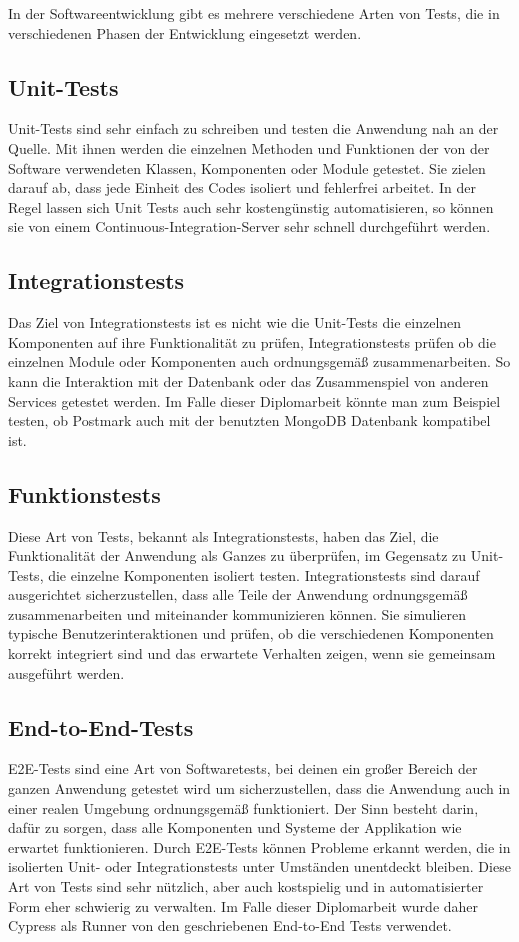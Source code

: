 In der Softwareentwicklung gibt es mehrere verschiedene Arten von Tests, die in verschiedenen Phasen der Entwicklung eingesetzt werden.

\subsection{Unit-Tests}
Unit-Tests sind sehr einfach zu schreiben und testen die Anwendung nah an der Quelle. Mit ihnen werden die einzelnen Methoden und Funktionen der von der Software verwendeten Klassen, Komponenten oder Module getestet. Sie zielen darauf ab, dass jede Einheit des Codes isoliert und fehlerfrei arbeitet. In der Regel lassen sich Unit Tests auch sehr kostengünstig automatisieren, so können sie von einem Continuous-Integration-Server sehr schnell durchgeführt werden.


\subsection{Integrationstests}
Das Ziel von Integrationstests ist es nicht wie die Unit-Tests die einzelnen Komponenten auf ihre Funktionalität zu prüfen, Integrationstests prüfen ob die einzelnen Module oder Komponenten auch ordnungsgemäß zusammenarbeiten. So kann die Interaktion mit der Datenbank oder das Zusammenspiel von anderen Services getestet werden. Im Falle dieser Diplomarbeit könnte man zum Beispiel testen, ob Postmark auch mit der benutzten MongoDB Datenbank kompatibel ist.

\subsection{Funktionstests}
Diese Art von Tests, bekannt als Integrationstests, haben das Ziel, die Funktionalität der Anwendung als Ganzes zu überprüfen, im Gegensatz zu Unit-Tests, die einzelne Komponenten isoliert testen. Integrationstests sind darauf ausgerichtet sicherzustellen, dass alle Teile der Anwendung ordnungsgemäß zusammenarbeiten und miteinander kommunizieren können. Sie simulieren typische Benutzerinteraktionen und prüfen, ob die verschiedenen Komponenten korrekt integriert sind und das erwartete Verhalten zeigen, wenn sie gemeinsam ausgeführt werden.

\subsection{End-to-End-Tests}
E2E-Tests sind eine Art von Softwaretests, bei deinen ein großer Bereich der ganzen Anwendung getestet wird um sicherzustellen, dass die Anwendung auch in einer realen Umgebung ordnungsgemäß funktioniert. Der Sinn besteht darin, dafür zu sorgen, dass alle Komponenten und Systeme der Applikation wie erwartet funktionieren. Durch E2E-Tests können Probleme erkannt werden, die in isolierten Unit- oder Integrationstests unter Umständen unentdeckt bleiben. Diese Art von Tests sind sehr nützlich, aber auch kostspielig und in automatisierter Form eher schwierig zu verwalten. Im Falle dieser Diplomarbeit wurde daher Cypress als Runner von den geschriebenen End-to-End Tests verwendet.
\cite{Verschiedene_Testarten}
